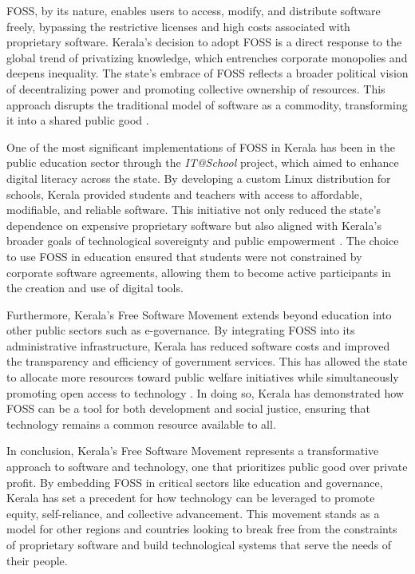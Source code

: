 \begin{refsection}
FOSS, by its nature, enables users to access, modify, and distribute software freely, bypassing the restrictive licenses and high costs associated with proprietary software. Kerala's decision to adopt FOSS is a direct response to the global trend of privatizing knowledge, which entrenches corporate monopolies and deepens inequality. The state's embrace of FOSS reflects a broader political vision of decentralizing power and promoting collective ownership of resources. This approach disrupts the traditional model of software as a commodity, transforming it into a shared public good \cite[pp.~165-167]{palackal2011information}.

One of the most significant implementations of FOSS in Kerala has been in the public education sector through the \textit{IT@School} project, which aimed to enhance digital literacy across the state. By developing a custom Linux distribution for schools, Kerala provided students and teachers with access to affordable, modifiable, and reliable software. This initiative not only reduced the state's dependence on expensive proprietary software but also aligned with Kerala's broader goals of technological sovereignty and public empowerment \cite{kurup2020freedom}. The choice to use FOSS in education ensured that students were not constrained by corporate software agreements, allowing them to become active participants in the creation and use of digital tools.

Furthermore, Kerala's Free Software Movement extends beyond education into other public sectors such as e-governance. By integrating FOSS into its administrative infrastructure, Kerala has reduced software costs and improved the transparency and efficiency of government services. This has allowed the state to allocate more resources toward public welfare initiatives while simultaneously promoting open access to technology \cite{iype2006kerala}. In doing so, Kerala has demonstrated how FOSS can be a tool for both development and social justice, ensuring that technology remains a common resource available to all.

In conclusion, Kerala's Free Software Movement represents a transformative approach to software and technology, one that prioritizes public good over private profit. By embedding FOSS in critical sectors like education and governance, Kerala has set a precedent for how technology can be leveraged to promote equity, self-reliance, and collective advancement. This movement stands as a model for other regions and countries looking to break free from the constraints of proprietary software and build technological systems that serve the needs of their people.


\end{refsection}
